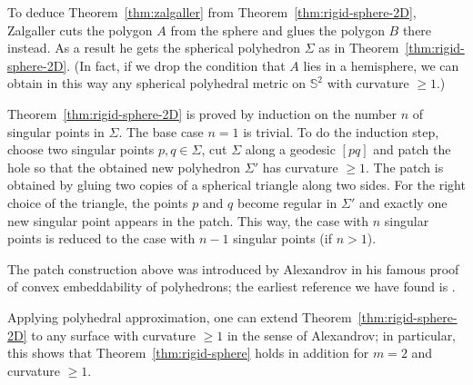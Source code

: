 \documentclass[oneside,a4paper]{article}
\begin{document}
To deduce Theorem~\ref{thm:zalgaller} from Theorem~\ref{thm:rigid-sphere-2D},
Zalgaller cuts the polygon $A$ from the sphere and glues the polygon $B$ there instead.
As a result he gets the spherical polyhedron $\Sigma$ as in Theorem~\ref{thm:rigid-sphere-2D}.
(In fact, if we drop the condition that $A$ lies in a hemisphere,
we can obtain in this way any spherical polyhedral metric on $\mathbb S^2$ with curvature $\ge 1$.)

Theorem~\ref{thm:rigid-sphere-2D} is proved by induction
on the number $n$ of singular points in $\Sigma$.
The base case $n=1$ is trivial.
To do the induction step,
choose two singular points $p, q\in\Sigma$,
cut $\Sigma$ along a geodesic $[pq]$
and patch the hole so that the obtained new polyhedron $\Sigma'$ has curvature $\ge 1$.
The patch is obtained by gluing two copies of a
spherical triangle along two sides.
For the right choice of the triangle,
the points $p$ and $q$ become regular in $\Sigma'$
and exactly one new singular point appears in the patch.
This way, the case with $n$ singular points is reduced
to the case with $n-1$ singular points (if $n>1$).

The patch construction above was introduced by Alexandrov
in his famous proof of convex embeddability of polyhedrons;
the earliest reference we have found is
\cite[VI, \S7]{alexandrov1948}.

Applying polyhedral approximation, one can extend Theorem~\ref{thm:rigid-sphere-2D}
to any surface with curvature $\ge 1$ in the sense of Alexandrov;
in particular, this shows that Theorem~\ref{thm:rigid-sphere} holds in addition for $m=2$ and curvature $\ge 1$.
\end{document}
